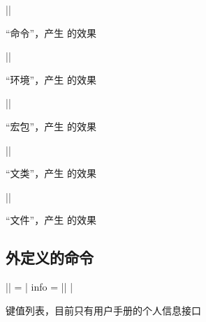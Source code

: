 \documentclass{xdyy-usermanual}
\begin{document}
\begin{function}{\cmd}
  \begin{syntax}
    ||
  \end{syntax}
  “命令”，产生  的效果
\end{function}
\begin{function}{\env}
  \begin{syntax}
    ||
  \end{syntax}
  “环境”，产生  的效果
\end{function}
\begin{function}{\pkg}
  \begin{syntax}
    ||
  \end{syntax}
  “宏包”，产生  的效果
\end{function}
\begin{function}{\cls}
  \begin{syntax}
    ||
  \end{syntax}
  “文类”，产生  的效果
\end{function}
\begin{function}{\file}
  \begin{syntax}
    ||
  \end{syntax}
  “文件”，产生  的效果
\end{function}


\subsection{  外定义的命令}

\begin{function}{\xdyymanualsetup}
  \begin{syntax}
    |\xdyymanualsetup| = |{ info = || }|
  \end{syntax}
  键值列表，目前只有用户手册的个人信息接口
  \begin{latexcode}
  \end{latexcode}
\end{function}
\end{document}
